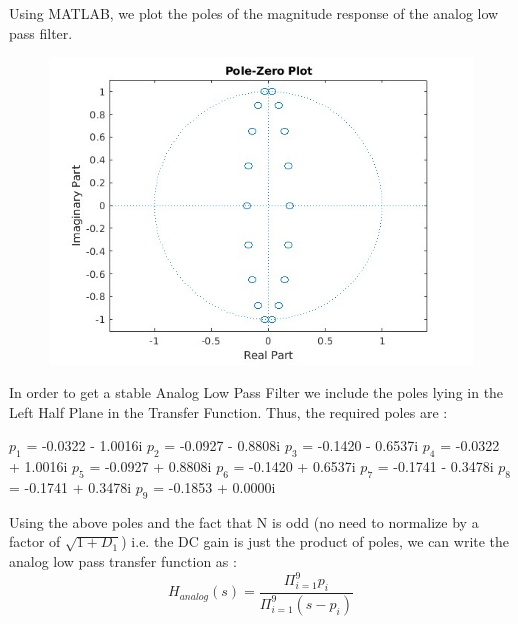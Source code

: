 \documentclass{article}
\begin{document}
Using MATLAB, we plot the poles of the magnitude response of the analog low pass filter.
\begin{figure}[H]
    \centering
    \includegraphics[scale = 0.5]{root_bpf.jpg}
    \caption{}
    \label{fig:my_label}
\end{figure}
In order to get a stable Analog Low Pass Filter we include the poles lying in the Left Half Plane in the Transfer Function. Thus, the required poles are :
        

  

\noindent
\vspace{1em}
\begin{center}
$p_1$ = -0.0322 - 1.0016i \newline
$p_2$ = -0.0927 - 0.8808i  \newline
$p_3$ = -0.1420 - 0.6537i \newline
$p_4$ = -0.0322 + 1.0016i \newline
$p_5$ = -0.0927 + 0.8808i \newline
$p_6$ = -0.1420 + 0.6537i \newline
$p_7$ = -0.1741 - 0.3478i \newline
$p_8$ = -0.1741 + 0.3478i \newline
$p_9$ = -0.1853 + 0.0000i  \newline
\end{center}
\noindent
\vspace{1em}
Using the above poles and the fact that N is odd (no need to normalize by a factor of $\sqrt{1 + D_1}$) i.e. the DC gain is just the product of poles, we can write the analog low pass transfer function as :
\begin{equation*}
    H_{analog}(s) = \frac{\Pi_{i=1}^{9} p_i}{\Pi_{i=1}^{9} (s - p_i)}
\end{equation*}
\end{document}
